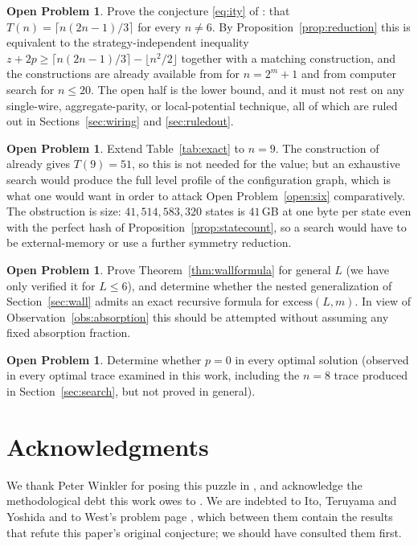 \documentclass[11pt]{amsart}
\theoremstyle{plain}
\theoremstyle{definition}
\newtheorem{openproblem}[theorem]{Open Problem}
\theoremstyle{remark}
\newcommand{\ex}{\mathrm{excess}}
\begin{document}
\begin{openproblem}
Prove the conjecture \eqref{eq:ity} of \cite{ITY}: that $T(n)=\lceil n(2n-1)/3\rceil$ for every $n\neq 6$. By Proposition~\ref{prop:reduction} this is equivalent to the strategy-independent inequality $z+2p\ge\lceil n(2n-1)/3\rceil-\lfloor n^2/2\rfloor$ together with a matching construction, and the constructions are already available from \cite{ITY} for $n=2^m+1$ and from computer search for $n\le 20$. The open half is the lower bound, and it must not rest on any single-wire, aggregate-parity, or local-potential technique, all of which are ruled out in Sections~\ref{sec:wiring} and \ref{sec:ruledout}.
\end{openproblem}

\begin{openproblem}
Extend Table~\ref{tab:exact} to $n=9$. The construction of \cite{ITY} already gives $T(9)=51$, so this is not needed for the value; but an exhaustive search would produce the full level profile of the configuration graph, which is what one would want in order to attack Open Problem~\ref{open:six} comparatively. The obstruction is size: $41{,}514{,}583{,}320$ states is $41$\,GB at one byte per state even with the perfect hash of Proposition~\ref{prop:statecount}, so a search would have to be external-memory or use a further symmetry reduction.
\end{openproblem}

\begin{openproblem}
Prove Theorem~\ref{thm:wallformula} for general $L$ (we have only verified it for $L\le 6$), and determine whether the nested generalization of Section~\ref{sec:wall} admits an exact recursive formula for $\ex(L,m)$. In view of Observation~\ref{obs:absorption} this should be attempted without assuming any fixed absorption fraction.
\end{openproblem}

\begin{openproblem}
Determine whether $p=0$ in every optimal solution (observed in every optimal trace examined in this work, including the $n=8$ trace produced in Section~\ref{sec:search}, but not proved in general).
\end{openproblem}

\section*{Acknowledgments}

We thank Peter Winkler for posing this puzzle in \cite{Winkler}, and acknowledge the methodological debt this work owes to \cite{MaitreD}. We are indebted to Ito, Teruyama and Yoshida \cite{ITY} and to West's problem page \cite{West}, which between them contain the results that refute this paper's original conjecture; we should have consulted them first.
\end{document}
